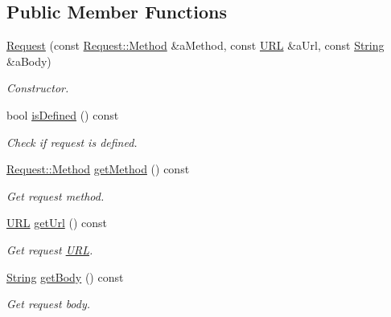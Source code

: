 \subsection*{Public Member Functions}
\begin{DoxyCompactItemize}
\item 
\hyperlink{classostk_1_1io_1_1ip_1_1tcp_1_1http_1_1_request_a7b67e5386b0aa2af737c74416c20f56b}{Request} (const \hyperlink{classostk_1_1io_1_1ip_1_1tcp_1_1http_1_1_request_a07a40d81f4a6fb8443c80afc11571dd3}{Request\+::\+Method} \&a\+Method, const \hyperlink{classostk_1_1io_1_1_u_r_l}{U\+RL} \&a\+Url, const \hyperlink{namespaceostk_1_1io_1_1ip_1_1tcp_1_1http_a88a1b82fb01d02df64ca01ef4058bbef}{String} \&a\+Body)
\begin{DoxyCompactList}\small\item\em Constructor. \end{DoxyCompactList}\item 
bool \hyperlink{classostk_1_1io_1_1ip_1_1tcp_1_1http_1_1_request_ac01119273b40874c0bb6a687fe7266b7}{is\+Defined} () const
\begin{DoxyCompactList}\small\item\em Check if request is defined. \end{DoxyCompactList}\item 
\hyperlink{classostk_1_1io_1_1ip_1_1tcp_1_1http_1_1_request_a07a40d81f4a6fb8443c80afc11571dd3}{Request\+::\+Method} \hyperlink{classostk_1_1io_1_1ip_1_1tcp_1_1http_1_1_request_a8c31b842f3672488b2fb42a304873a94}{get\+Method} () const
\begin{DoxyCompactList}\small\item\em Get request method. \end{DoxyCompactList}\item 
\hyperlink{classostk_1_1io_1_1_u_r_l}{U\+RL} \hyperlink{classostk_1_1io_1_1ip_1_1tcp_1_1http_1_1_request_a75e34ca54feb62159075147444ffa6ec}{get\+Url} () const
\begin{DoxyCompactList}\small\item\em Get request \hyperlink{classostk_1_1io_1_1_u_r_l}{U\+RL}. \end{DoxyCompactList}\item 
\hyperlink{namespaceostk_1_1io_1_1ip_1_1tcp_1_1http_a88a1b82fb01d02df64ca01ef4058bbef}{String} \hyperlink{classostk_1_1io_1_1ip_1_1tcp_1_1http_1_1_request_a1aa99b1bc1fdd0b29e86a27331a2d6fa}{get\+Body} () const
\begin{DoxyCompactList}\small\item\em Get request body. \end{DoxyCompactList}\end{DoxyCompactItemize}
